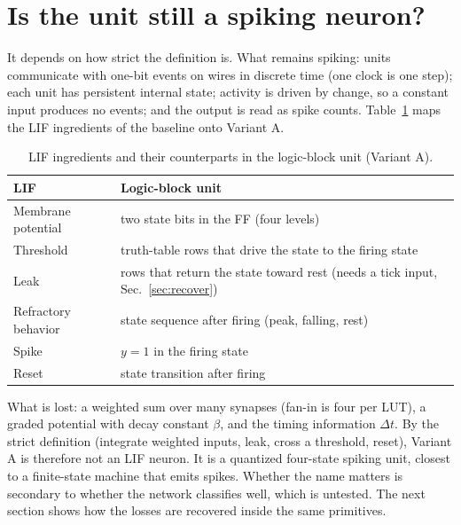 \section{Is the unit still a spiking neuron?}
\label{sec:snnq}
It depends on how strict the definition is. What remains spiking: units communicate with one-bit events on wires in discrete time (one clock is one step); each unit has persistent internal state; activity is driven by change, so a constant input produces no events; and the output is read as spike counts. Table~\ref{tab:lif} maps the LIF ingredients of the baseline onto Variant A.

\begin{table}[t]
\centering
\caption{LIF ingredients and their counterparts in the logic-block unit (Variant A).}
\label{tab:lif}
\begin{tabular}{@{}p{4.2cm}p{9.5cm}@{}}
\toprule
LIF~\cite{windhager2024} & Logic-block unit\\
\midrule
Membrane potential & two state bits in the FF (four levels)\\
Threshold & truth-table rows that drive the state to the firing state\\
Leak & rows that return the state toward rest (needs a tick input, Sec.~\ref{sec:recover})\\
Refractory behavior & state sequence after firing (peak, falling, rest)\\
Spike & $y=1$ in the firing state\\
Reset & state transition after firing\\
\bottomrule
\end{tabular}
\end{table}

What is lost: a weighted sum over many synapses (fan-in is four per LUT), a graded potential with decay constant $\beta$, and the timing information $\Delta t$. By the strict definition (integrate weighted inputs, leak, cross a threshold, reset), Variant A is therefore not an LIF neuron. It is a quantized four-state spiking unit, closest to a finite-state machine that emits spikes. Whether the name matters is secondary to whether the network classifies well, which is untested. The next section shows how the losses are recovered inside the same primitives.
